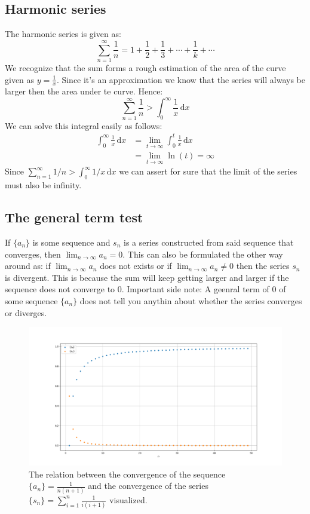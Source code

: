 \documentclass[11pt, a4paper]{article}
\renewcommand*{\d}{\,\text{d}}
\begin{document}
\subsection{Harmonic series}
The harmonic series is given as:
\begin{equation*}
  \sum_{n=1}^{\infty} \frac{1}{n} = 1 + \frac{1}{2} + \frac{1}{3} + \cdots + \frac{1}{k} + \cdots
\end{equation*}
We recognize that the sum forms a rough estimation of the area of the curve given as $y = \frac{1}{x}$. Since it's an approximation we know that the series will always be larger then the area under te curve. Hence:
\begin{equation*}
  \sum_{n=1}^{\infty} \frac{1}{n} > \int_0^\infty \frac{1}{x} \d x
\end{equation*}
We can solve this integral easily as follows:
\begin{align*}
  \int_0^\infty \frac{1}{x} \d x &= \lim_{t\to\infty}\int_0^t \frac{1}{x} \d x\\
                                 &= \lim_{t\to\infty} \ln(t) = \infty
\end{align*}
Since $\sum_{n=1}^{\infty} 1/n > \int_0^\infty 1/x \d x$ we can assert for sure that the limit of the series must also be infinity.


\subsection{The general term test}
If $\{ a_n \}$ is some sequence and $s_n$ is a series constructed from said sequence that converges, then $\lim_{n\to\infty} a_n = 0$. This can also be formulated the other way around as: if $\lim_{n\to\infty} a_n$ does not exists or if $\lim_{n\to\infty} a_n \neq 0$ then the series $s_n$ is divergent.  This is because the sum will keep getting larger and larger if the sequence does not converge to $0$. Important side note: A geenral term of $0$ of some sequence $\{ a_n \}$ does not tell you anythin about whether the series converges or diverges.
\begin{figure}[h]
  \centerline{\includegraphics[width=150mm]{images/Converging_visualization.png}}
  \caption{The relation between the convergence of the sequence $\{ a_n \} = \frac{1}{n(n+1)}$ and the convergence of the series $\{ s_n \} = \sum_{i=1}^{n}\frac{1}{i(i+1)}$ visualized.}
\end{figure}
\end{document}
